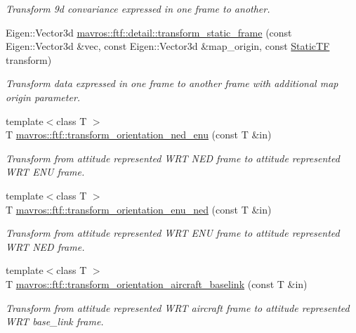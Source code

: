 \begin{DoxyCompactItemize}
\begin{DoxyCompactList}\small\item\em Transform 9d convariance expressed in one frame to another. \end{DoxyCompactList}\item 
Eigen\+::\+Vector3d \mbox{\hyperlink{group__nodelib_ga3907cb8493e1b0c7ae33dbc1e8185a88}{mavros\+::ftf\+::detail\+::transform\+\_\+static\+\_\+frame}} (const Eigen\+::\+Vector3d \&vec, const Eigen\+::\+Vector3d \&map\+\_\+origin, const \mbox{\hyperlink{group__nodelib_gacff0983128574bbbe115917b13e57a63}{Static\+TF}} transform)
\begin{DoxyCompactList}\small\item\em Transform data expressed in one frame to another frame with additional map origin parameter. \end{DoxyCompactList}\item 
{\footnotesize template$<$class T $>$ }\\T \mbox{\hyperlink{group__nodelib_ga3c14c70db9b58d2aef2d9f84395bb876}{mavros\+::ftf\+::transform\+\_\+orientation\+\_\+ned\+\_\+enu}} (const T \&in)
\begin{DoxyCompactList}\small\item\em Transform from attitude represented W\+RT N\+ED frame to attitude represented W\+RT E\+NU frame. \end{DoxyCompactList}\item 
{\footnotesize template$<$class T $>$ }\\T \mbox{\hyperlink{group__nodelib_ga60f73ab88fd56337bf2572fe696d1d04}{mavros\+::ftf\+::transform\+\_\+orientation\+\_\+enu\+\_\+ned}} (const T \&in)
\begin{DoxyCompactList}\small\item\em Transform from attitude represented W\+RT E\+NU frame to attitude represented W\+RT N\+ED frame. \end{DoxyCompactList}\item 
{\footnotesize template$<$class T $>$ }\\T \mbox{\hyperlink{group__nodelib_ga01f847ac9369bb566b8f671ce7a9ec7c}{mavros\+::ftf\+::transform\+\_\+orientation\+\_\+aircraft\+\_\+baselink}} (const T \&in)
\begin{DoxyCompactList}\small\item\em Transform from attitude represented W\+RT aircraft frame to attitude represented W\+RT base\+\_\+link frame. \end{DoxyCompactList}\item 

\end{DoxyCompactItemize}
